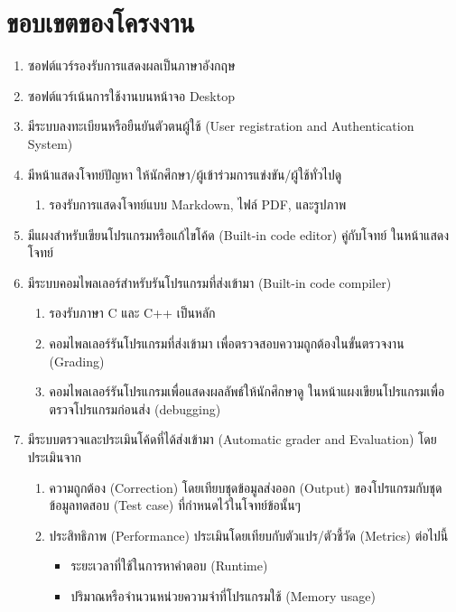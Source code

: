 \documentclass[12pt,one side,openright,a4paper]{cpe-thesis-th}
\begin{document}
\section{ขอบเขตของโครงงาน}
\begin{enumerate}
  \item ซอฟต์แวร์รองรับการแสดงผลเป็นภาษาอังกฤษ
  \item ซอฟต์แวร์เน้นการใช้งานบนหน้าจอ Desktop
  \item มีระบบลงทะเบียนหรือยืนยันตัวตนผู้ใช้ (User registration and Authentication System)
  \item มีหน้าแสดงโจทย์ปัญหา ให้นักศึกษา/ผู้เข้าร่วมการแข่งขัน/ผู้ใช้ทั่วไปดู
        \begin{enumerate}
          \item รองรับการแสดงโจทย์แบบ Markdown, ไฟล์ PDF, และรูปภาพ
        \end{enumerate}
  \item มีแผงสำหรับเขียนโปรแกรมหรือแก้ไขโค้ด (Built-in code editor) คู่กับโจทย์ ในหน้าแสดงโจทย์
  \item มีระบบคอมไพลเลอร์สำหรับรันโปรแกรมที่ส่งเข้ามา (Built-in code compiler)
        \begin{enumerate}
          \item รองรับภาษา C และ C++ เป็นหลัก
          \item คอมไพลเลอร์รันโปรแกรมที่ส่งเข้ามา เพื่อตรวจสอบความถูกต้องในขั้นตรวจงาน (Grading)
          \item คอมไพลเลอร์รันโปรแกรมเพื่อแสดงผลลัพธ์ให้นักศึกษาดู ในหน้าแผงเขียนโปรแกรมเพื่อตรวจโปรแกรมก่อนส่ง (debugging)
        \end{enumerate}
  \item มีระบบตรวจและประเมินโค้ดที่ได้ส่งเข้ามา (Automatic grader and Evaluation) โดยประเมินจาก
        \begin{enumerate}
          \item ความถูกต้อง (Correction) โดยเทียบชุดข้อมูลส่งออก (Output) ของโปรแกรมกับชุดข้อมูลทดสอบ (Test case) ที่กำหนดไว้ในโจทย์ข้อนั้นๆ
          \item ประสิทธิภาพ (Performance) ประเมินโดยเทียบกับตัวแปร/ตัวชี้วัด (Metrics) ต่อไปนี้
                \begin{itemize}
                  \item ระยะเวลาที่ใช้ในการหาคำตอบ (Runtime)
                  \item ปริมาณหรือจำนวนหน่วยความจำที่โปรแกรมใช้ (Memory usage)
                \end{itemize}
        \end{enumerate}

\end{enumerate}
\end{document}
